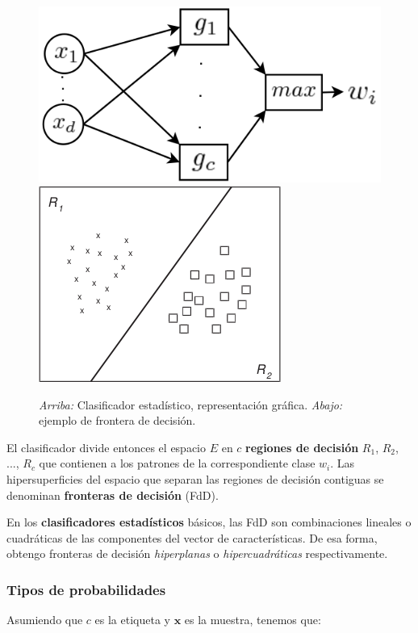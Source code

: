 \documentclass[10pt,a4paper]{article}
\begin{document}
\begin{figure}
  \caption{\textit{Arriba:} Clasificador estadístico, representación gráfica. \textit{Abajo:} ejemplo de frontera de decisión.}
  \label{fig:clasificador} 
  \centering 
  \hbox{\includegraphics[width=0.3\textwidth-\fboxrule-\fboxrule]{imgs/clasificador.png}}  
  \vspace{2.3em}
  \centering 
  \hbox{\includegraphics[width=0.3\textwidth-\fboxrule-\fboxrule]{imgs/regiones_decision.png}}  
\end{figure}	

El clasificador divide entonces el espacio $E$ en $c$ \textbf{regiones de decisión} $R_1$, $R_2$, ..., $R_c$ que contienen a los patrones de la correspondiente clase $w_i$. Las hipersuperficies del espacio que separan las regiones de decisión contiguas se denominan \textbf{fronteras de decisión} (FdD).

En los \textbf{clasificadores estadísticos} básicos, las FdD son combinaciones lineales o cuadráticas de las componentes del vector de características. De esa forma, obtengo fronteras de decisión \textit{hiperplanas} o \textit{hipercuadráticas} respectivamente.

\subsubsection{Tipos de probabilidades}

Asumiendo que $c$ es la etiqueta y $\mathbf{x}$ es la muestra, tenemos que:
\end{document}
